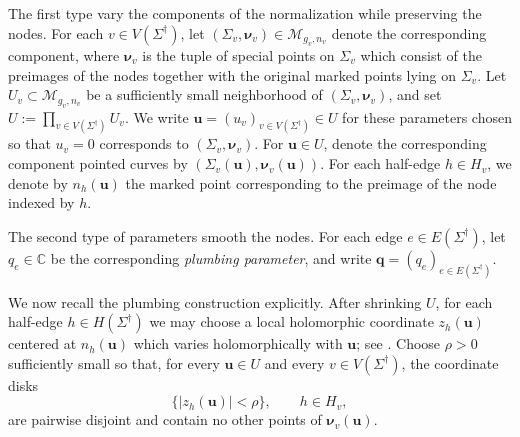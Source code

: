 \documentclass[12pt]{amsart}
\numberwithin{equation}{section}
\theoremstyle{definition}
\newcommand{\C}{\mathbb{C}}
\def\vertices{V}
\def\edges{E}
\def\trop{\dagger}
\def\mcurve{\Sigma}
\def\tropmcurve{\mcurve^\trop}
\begin{document}
The first type vary the components of the normalization while
preserving the nodes. For each $v\in\vertices(\tropmcurve)$, let
$
(\mcurve_v,\bm\nu_v)
\in
\mathcal M_{g_v,n_v}
$
denote the corresponding component, where $\bm\nu_v$ is the
tuple of special points on $\mcurve_v$ which consist of the preimages of the nodes together with the original marked
points lying on $\mcurve_v$. %
Let
$
U_v\subset\mathcal M_{g_v,n_v}
$
be a sufficiently small neighborhood of
$(\mcurve_v,\bm\nu_v)$, and set
$
U
:=
\prod_{v\in\vertices(\tropmcurve)}U_v.
$
We write
$
\bm u=(u_v)_{v\in\vertices(\tropmcurve)}\in U
$
for these parameters chosen so that
$u_v=0$ corresponds to $(\mcurve_v,\bm\nu_v)$. For $\bm u\in U$, denote the corresponding component pointed curves by
$
(\mcurve_v(\bm u),\bm\nu_v(\bm u)).
$
For each half-edge $h\in H_v$, we denote by
$
n_h(\bm u)
$
the marked point corresponding to the preimage of the node indexed by
$h$. 

The second type of parameters smooth the nodes. For each edge
$e\in\edges(\tropmcurve)$, let
$
q_e\in\C
$
be the corresponding \emph{plumbing parameter}, and write
$
\bm q=(q_e)_{e\in\edges(\tropmcurve)}.
$


We now recall the plumbing construction explicitly. After shrinking
$U$, for each half-edge $h\in H(\tropmcurve)$ we may choose a local
holomorphic coordinate
$
z_h(\bm u)
$
centered at $n_h(\bm u)$ which varies holomorphically with $\bm u$; see
\cite[Section~8.1]{HubbardKoch}. Choose $\rho>0$ sufficiently small so
that, for every $\bm u\in U$ and every
$v\in\vertices(\tropmcurve)$, the coordinate disks
\[
\{
|z_h(\bm u)|<\rho
\},
\qquad
h\in H_v,
\]
are pairwise disjoint and contain no other points of
$\bm\nu_v(\bm u)$.
\end{document}
